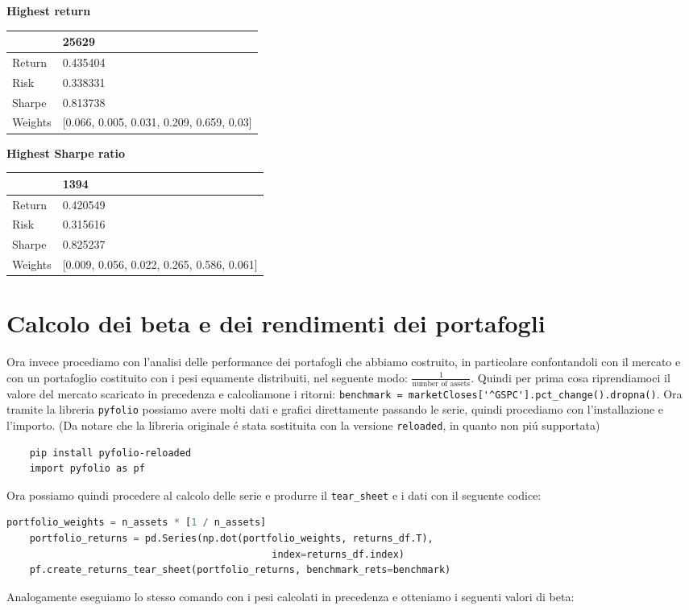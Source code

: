 \documentclass{report}
\begin{document}
\textbf{Highest return}

\begin{tabular}{ll}
\toprule
{} &                                      25629 \\
\midrule
Return  &                                   0.435404 \\
Risk    &                                   0.338331 \\
Sharpe  &                                   0.813738 \\
Weights &  [0.066, 0.005, 0.031, 0.209, 0.659, 0.03] \\
\bottomrule
\end{tabular}

\textbf{Highest Sharpe ratio}

\begin{tabular}{ll}
\toprule
{} &                                        1394 \\
\midrule
Return  &                                    0.420549 \\
Risk    &                                    0.315616 \\
Sharpe  &                                    0.825237 \\
Weights &  [0.009, 0.056, 0.022, 0.265, 0.586, 0.061] \\
\bottomrule
\end{tabular}


\section{Calcolo dei beta e dei rendimenti dei portafogli}

Ora invece procediamo con l'analisi delle performance dei portafogli che abbiamo costruito, in particolare confontandoli con il mercato e con un portafoglio costituito con i pesi equamente distribuiti, nel seguente modo:  \(\frac{1}{\text{number of assets}}\). Quindi per prima cosa riprendiamoci il valore del mercato scaricato in precedenza e calcoliamone i ritorni: \lstinline{benchmark = marketCloses['^GSPC'].pct_change().dropna()}. Ora tramite la libreria \lstinline{pyfolio} possiamo avere molti dati e grafici direttamente passando le serie, quindi procediamo con l'installazione e l'importo. (Da notare che la libreria originale é stata sostituita con la versione \lstinline{reloaded}, in quanto non piú supportata)
\begin{lstlisting}
    pip install pyfolio-reloaded
    import pyfolio as pf
\end{lstlisting}
Ora possiamo quindi procedere al calcolo delle serie e produrre il \lstinline{tear_sheet} e i dati con il seguente codice:
\begin{lstlisting}[language=python]
    portfolio_weights = n_assets * [1 / n_assets]
    portfolio_returns = pd.Series(np.dot(portfolio_weights, returns_df.T),
                                              index=returns_df.index)
    pf.create_returns_tear_sheet(portfolio_returns, benchmark_rets=benchmark)
\end{lstlisting}
 Analogamente eseguiamo lo stesso comando con i pesi calcolati in precedenza
 e otteniamo i seguenti valori di beta:
\end{document}
